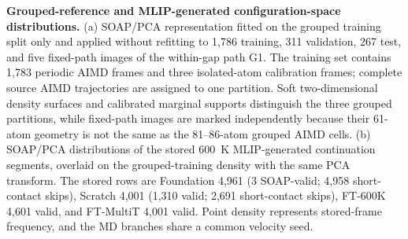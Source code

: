 \caption{\textbf{Grouped-reference and MLIP-generated configuration-space distributions.} (a) SOAP/PCA representation fitted on the grouped training split only and applied without refitting to 1,786 training, 311 validation, 267 test, and five fixed-path images of the within-gap path G1. The training set contains 1,783 periodic AIMD frames and three isolated-atom calibration frames; complete source AIMD trajectories are assigned to one partition. Soft two-dimensional density surfaces and calibrated marginal supports distinguish the three grouped partitions, while fixed-path images are marked independently because their 61-atom geometry is not the same as the 81--86-atom grouped AIMD cells. (b) SOAP/PCA distributions of the stored 600~K MLIP-generated continuation segments, overlaid on the grouped-training density with the same PCA transform. The stored rows are Foundation 4,961 (3 SOAP-valid; 4,958 short-contact skips), Scratch 4,001 (1,310 valid; 2,691 short-contact skips), FT-600K 4,601 valid, and FT-MultiT 4,001 valid. Point density represents stored-frame frequency, and the MD branches share a common velocity seed.}
\label{fig:task_conditioned_distribution_atlas}
